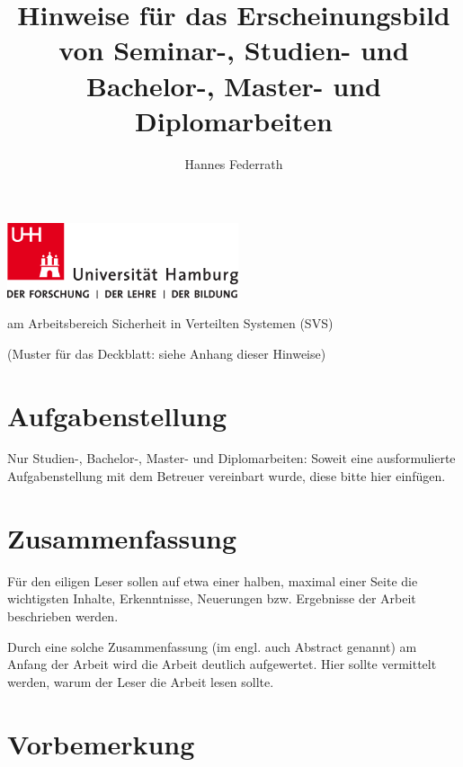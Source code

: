 \documentclass[
    fontsize=12pt,
    headings=small,
    parskip=half,           %
    bibliography=totoc,
    numbers=noenddot,       %
    open=any,               %
    ]{scrreprt}
\title{Hinweise für das Erscheinungsbild von Seminar-, Studien- und Bachelor-,
    Master- und Diplomarbeiten}
\author{Hannes Federrath}
\begin{document}
\begin{titlepage}
\includegraphics[width=6.8cm]{../pic/up-uhh-logo-u-2010-u-farbe-u-rgb.pdf}
\begin{center}\Large
    \vfill
    \makeatletter
    {\Large\textsf{\textbf{\@title}}\par}
    \makeatother
    \bigskip
    am Arbeitsbereich Sicherheit in Verteilten Systemen (SVS) \par
    \bigskip
    \makeatletter
    {\@author} \par
    \makeatother
    \bigskip
    \makeatletter
    {\@date}
    \makeatother
    \vfill
    \vfill
    (Muster für das Deckblatt: siehe Anhang dieser Hinweise)
\end{center}
\end{titlepage}


\chapter*{Aufgabenstellung}

Nur Studien-, Bachelor-, Master- und Diplomarbeiten: Soweit eine ausformulierte Aufgabenstellung mit dem Betreuer vereinbart wurde, diese bitte hier einfügen.

\chapter*{Zusammenfassung}

Für den eiligen Leser sollen auf etwa einer halben, maximal einer Seite die wichtigsten Inhalte, Erkenntnisse, Neuerungen bzw. Ergebnisse der Arbeit beschrieben werden.

Durch eine solche Zusammenfassung (im engl. auch Abstract genannt) am Anfang der Arbeit wird die Arbeit deutlich aufgewertet. Hier sollte vermittelt werden, warum der Leser die Arbeit lesen sollte.

\tableofcontents

\chapter{Vorbemerkung}
\end{document}
